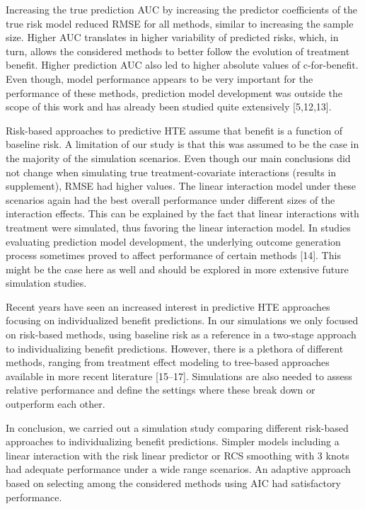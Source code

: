 \documentclass{article}
\begin{document}
Increasing the true prediction AUC by increasing the predictor
coefficients of the true risk model reduced RMSE for all methods,
similar to increasing the sample size. Higher AUC translates in higher
variability of predicted risks, which, in turn, allows the considered
methods to better follow the evolution of treatment benefit. Higher
prediction AUC also led to higher absolute values of c-for-benefit. Even
though, model performance appears to be very important for the
performance of these methods, prediction model development was outside
the scope of this work and has already been studied quite extensively
{[}5,12,13{]}.

Risk-based approaches to predictive HTE assume that benefit is a
function of baseline risk. A limitation of our study is that this was
assumed to be the case in the majority of the simulation scenarios. Even
though our main conclusions did not change when simulating true
treatment-covariate interactions (results in supplement), RMSE had
higher values. The linear interaction model under these scenarios again
had the best overall performance under different sizes of the
interaction effects. This can be explained by the fact that linear
interactions with treatment were simulated, thus favoring the linear
interaction model. In studies evaluating prediction model development,
the underlying outcome generation process sometimes proved to affect
performance of certain methods {[}14{]}. This might be the case here as
well and should be explored in more extensive future simulation studies.

Recent years have seen an increased interest in predictive HTE
approaches focusing on individualized benefit predictions. In our
simulations we only focused on risk-based methods, using baseline risk
as a reference in a two-stage approach to individualizing benefit
predictions. However, there is a plethora of different methods, ranging
from treatment effect modeling to tree-based approaches available in
more recent literature {[}15--17{]}. Simulations are also needed to
assess relative performance and define the settings where these break
down or outperform each other.

In conclusion, we carried out a simulation study comparing different
risk-based approaches to individualizing benefit predictions. Simpler
models including a linear interaction with the risk linear predictor or
RCS smoothing with 3 knots had adequate performance under a wide range
scenarios. An adaptive approach based on selecting among the considered
methods using AIC had satisfactory performance.
\end{document}

